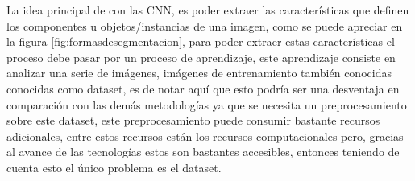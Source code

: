 \documentclass[conference,compsoc]{IEEEtran}
\begin{document}
La idea principal de con las CNN, es poder extraer las características que definen los componentes u objetos/instancias de una imagen, como se puede apreciar en la figura \ref{fig:formasdesegmentacion}, para poder extraer estas características el proceso debe pasar por un proceso de aprendizaje, este aprendizaje consiste en analizar una serie de imágenes, imágenes de entrenamiento también conocidas conocidas como dataset, es de notar aquí que esto podría ser una desventaja en comparación con las demás metodologías ya que se necesita un preprocesamiento sobre este dataset, este preprocesamiento puede consumir bastante recursos adicionales, entre estos recursos están los recursos computacionales pero, gracias al avance de las tecnologías estos son bastantes accesibles, entonces teniendo de cuenta esto el único problema es el dataset.
\end{document}

